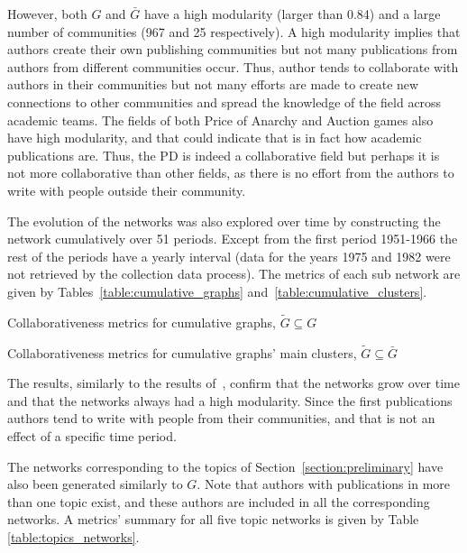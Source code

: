 However, both \(G\) and \(\bar{G}\) have a high modularity (larger than 0.84) and a large number of
communities (967 and 25 respectively). A high modularity implies that authors create their own publishing
communities but not many publications from authors from different communities
occur. Thus, author tends to collaborate with authors in their communities but
not many efforts are made to create new connections to other communities and
spread the knowledge of the field across academic teams. The fields
of both Price of Anarchy and Auction games also have high modularity, and
that could indicate that is in fact how academic publications are.
Thus, the PD is indeed a collaborative field but perhaps it is not
more collaborative than other fields, as there is no effort from the authors
to write with people outside their community.

The evolution of the networks was also explored over time by constructing the
network cumulatively over 51 periods. Except from the first period 1951-1966 the
rest of the periods have a yearly interval (data for the years 1975 and 1982
were not retrieved by the collection data process). The metrics of each sub
network are given by Tables~\ref{table:cumulative_graphs} and~\ref{table:cumulative_clusters}.

\begin{table}[!hbtp]
    \centering
    \resizebox{\textwidth}{!}{
    }
    \caption{Collaborativeness metrics for cumulative graphs, \(\tilde{G} \subseteq G\)}\label{table:cumulative_graphs}
\end{table}

\begin{table}[!hbtp]
    \centering
    \resizebox{\textwidth}{!}{
    }
    \caption{Collaborativeness metrics for cumulative graphs' main clusters, \(\tilde{G} \subseteq \bar{G}\)}\label{table:cumulative_clusters}
\end{table}

The results, similarly to the results of~\cite{Liu2015}, confirm that the
networks grow over time and that the networks always had a high modularity.
Since the first publications authors tend to write with people from their
communities, and that is not an effect of a specific time period.

The networks corresponding to the topics of Section~\ref{section:preliminary} have
also been generated similarly to \(G\). Note that authors with publications in
more than one topic exist, and these authors are included in all the corresponding
networks. A metrics' summary for all five topic networks is given by Table
\ref{table:topics_networks}.

